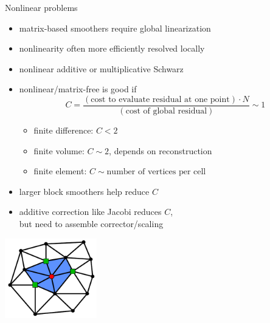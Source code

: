\begin{frame}{Nonlinear problems}
  \begin{itemize}
  \item matrix-based smoothers require global linearization
  \item nonlinearity often more efficiently resolved locally
  \item nonlinear additive or multiplicative Schwarz
  \item nonlinear/matrix-free is good if
    \[ C = \frac{(\text{cost to evaluate residual at one point}) \cdot N}{(\text{cost of global residual})} \sim 1 \]
    \begin{itemize}
    \item finite difference: $C < 2$
    \item finite volume: $C \sim 2$, depends on reconstruction
    \item finite element: $C \sim \text{number of vertices per cell}$
    \end{itemize}
  \item larger block smoothers help reduce $C$
  \item additive correction like Jacobi reduces $C$, \\
    but need to assemble corrector/scaling
  \end{itemize}
  \vspace{-4.5em}
  \hfill \includegraphics[width=0.3\textwidth]{figures/NodeStencil}
\end{frame}
